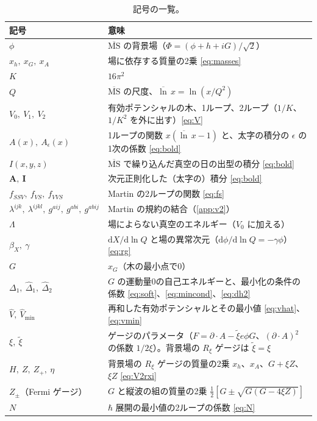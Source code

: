 \documentclass[a4paper,10pt]{ltjsarticle}
\newcommand{\dd}{\mathrm{d}}
\newcommand{\MSbar}{\overline{\mathrm{MS}}}
\newcommand{\lnb}{\overline{\ln}\,}
\newcommand{\Aeps}{A_\epsilon}
\begin{document}
\begin{table}[tbp]
\centering\small
\caption{記号の一覧。}
\label{tab:notation}
\begin{tabularx}{\linewidth}{>{\raggedright\arraybackslash}p{4.2cm}X}
\toprule
記号 & 意味 \\
\midrule
$\phi$ & $\MSbar$ の背景場（$\Phi=(\phi+h+iG)/\sqrt2$） \\
$x_h,\ x_G,\ x_A$ & 場に依存する質量の2乗 \eqref{eq:masses} \\
$K$ & $16\pi^2$ \\
$Q$ & $\MSbar$ の尺度、$\lnb x=\ln(x/Q^2)$ \\
$V_0,\ V_1,\ V_2$ & 有効ポテンシャルの木、1ループ、2ループ（$1/K$、$1/K^2$ を外に出す）\eqref{eq:V} \\
$A(x),\ \Aeps(x)$ & 1ループの関数 $x(\lnb x-1)$ と、太字の積分の $\epsilon$ の1次の係数 \eqref{eq:bold} \\
$I(x,y,z)$ & $\MSbar$ で繰り込んだ真空の日の出型の積分 \eqref{eq:bold} \\
$\mathbf A,\ \mathbf I$ & 次元正則化した（太字の）積分 \eqref{eq:bold} \\
$f_{SSV},\ f_{VS},\ f_{VVS}$ & Martin の2ループの関数 \eqref{eq:fs} \\
$\lambda^{ijk},\ \lambda^{ijkl},\ g^{aij},\ g^{abi},\ g^{abij}$ & Martin の規約の結合（\ref{app:v2}） \\
$\Lambda$ & 場によらない真空のエネルギー（$V_0$ に加える） \\
$\beta_X,\ \gamma$ & $\dd X/\dd\ln Q$ と場の異常次元（$\dd\phi/\dd\ln Q=-\gamma\phi$）\eqref{eq:rg} \\
$G$ & $x_G$（木の最小点で0） \\
$\Delta_1,\ \hat\Delta_1,\ \hat\Delta_2$ & $G$ の運動量0の自己エネルギーと、最小化の条件の係数 \eqref{eq:soft}、\eqref{eq:mincond}、\eqref{eq:dh2} \\
$\hat V,\ \hat V_{\min}$ & 再和した有効ポテンシャルとその最小値 \eqref{eq:vhat}、\eqref{eq:vmin} \\
$\xi,\ \tilde\xi$ & ゲージのパラメータ（$F=\partial\!\cdot\!A-\tilde\xi e\phi G$、$(\partial\!\cdot\!A)^2$ の係数 $1/2\xi$）。背景場の $R_\xi$ ゲージは $\tilde\xi=\xi$ \\
$H,\ Z,\ Z_+,\ \eta$ & 背景場の $R_\xi$ ゲージの質量の2乗 $x_h$、$x_A$、$G+\xi Z$、$\xi Z$ \eqref{eq:V2rxi} \\
$Z_\pm$（Fermi ゲージ） & $G$ と縦波の組の質量の2乗 $\frac12[G\pm\sqrt{G(G-4\xi Z)}]$ \\
$N$ & $\hbar$ 展開の最小値の2ループの係数 \eqref{eq:N} \\

\end{tabularx}
\end{table}
\end{document}

